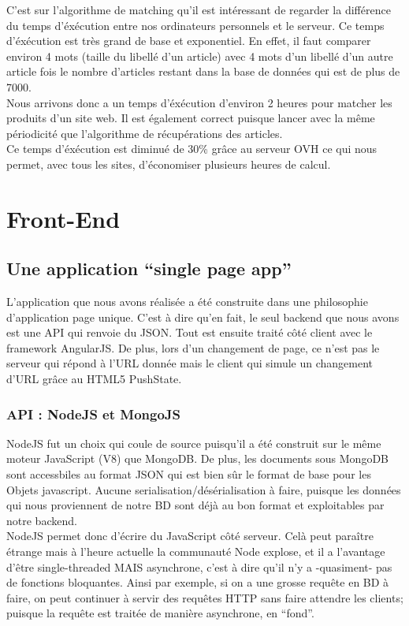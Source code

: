 \documentclass{report}
\begin{document}
C'est sur l'algorithme de matching qu'il est intéressant de regarder la différence du temps d'éxécution entre nos ordinateurs personnels et le serveur. Ce temps d'éxécution est très grand de base et exponentiel. En effet, il faut comparer environ 4 mots (taille du libellé d'un article) avec 4 mots d'un libellé d'un autre article fois le nombre d'articles restant dans la base de données qui est de plus de 7000.\\
Nous arrivons donc a un temps d'éxécution d'environ 2 heures pour matcher les produits d'un site web. Il est également correct puisque lancer avec la même périodicité que l'algorithme de récupérations des articles.\\
Ce temps d'éxécution est diminué de 30\% grâce au serveur OVH ce qui nous permet, avec tous les sites, d'économiser plusieurs heures de calcul.

\chapter{Front-End}

\section{Une application “single page app”}
L'application que nous avons réalisée a été construite dans une philosophie d'application page unique. C'est à dire qu'en fait, le seul backend que nous avons est une API qui renvoie du JSON. Tout est ensuite traité côté client avec le framework AngularJS. De plus, lors d'un changement de page, ce n'est pas le serveur qui répond à l'URL donnée mais le client qui simule un changement d'URL grâce au HTML5 PushState.

\subsection{API : NodeJS et MongoJS}
NodeJS fut un choix qui coule de source puisqu'il a été construit sur le même moteur JavaScript (V8) que MongoDB. De plus, les documents sous MongoDB sont accessbiles au format JSON qui est bien sûr le format de base pour les Objets javascript. Aucune serialisation/désérialisation à faire, puisque les données qui nous proviennent de notre BD sont déjà au bon format et exploitables par notre backend.\\

NodeJS permet donc d'écrire du JavaScript côté serveur. Celà peut paraître étrange mais à l'heure actuelle la communauté Node explose, et il a l'avantage d'être single-threaded MAIS asynchrone, c'est à dire qu'il n'y a -quasiment- pas de fonctions bloquantes. Ainsi par exemple, si on a une grosse requête en BD à faire, on peut continuer à servir des requêtes HTTP sans faire attendre les clients; puisque la requête est traitée de manière asynchrone, en “fond”.\\\\
\end{document}
